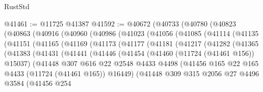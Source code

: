\begin{lexlean}{RustStd}
\begin{coremodule}
@41461 := @11725 @41387
@41592 := @40672
    (@40733
      (@40780
        (@40823
          (@40863
            (@40916
              (@40960
                (@40986
                  (@41023
                    (@41056
                      (@41085
                        (@41114
                          (@41135
                            (@41151
                              (@41165
                                (@41169
                                  (@41173
                                    (@41177
                                      (@41181
                                        (@41217
                                          (@41282
                                            (@41365
                                              (@41383
                                                (@41431
                                                  (@41441
                                                    (@41446
                                                      (@41454
                                                        (@41460 (@11724 (@41461 @156)) @15037)
                                                        (@41448
                                                          @307
                                                          @616
                                                          @22
                                                          @2548
                                                          @4433
                                                          @4498
                                                          (@41456
                                                            @165
                                                            @22
                                                            @165
                                                            @4433
                                                            (@11724 (@41461 @165))
                                                            @16449)
                                                          (@41448
                                                            @309
                                                            @315
                                                            @2056
                                                            @27
                                                            @4496
                                                            @3584
                                                            (@41456
                                                              @254

\end{coremodule}
\end{lexlean}

